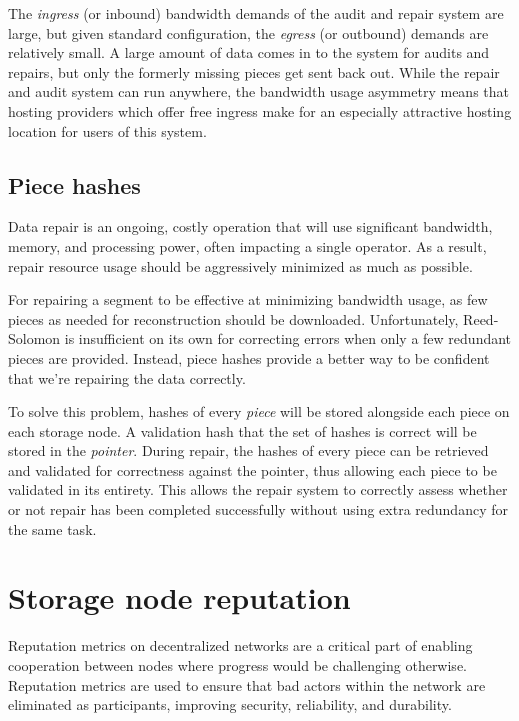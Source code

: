 \documentclass[8pt,fleqn,openany]{book}
\begin{document}
The {\em ingress} (or inbound) bandwidth demands of the audit and repair system are large, but
given standard configuration, the {\em egress} (or outbound) demands are relatively small.
A large amount of data comes in to the system for audits and repairs, but only
the formerly missing pieces get sent back out.
While the repair and audit system can run anywhere, the bandwidth usage
asymmetry means that hosting providers which offer free ingress
make for an especially attractive hosting location for users of this system.

\subsection{Piece hashes}\label{sec:concrete-piece-hashes}

Data repair is an ongoing, costly operation that will use significant
bandwidth, memory, and processing power, often impacting a single operator.
As a result, repair resource usage should be aggressively minimized as much as
possible.

For repairing a segment to be effective at minimizing bandwidth usage, as few
pieces as needed for reconstruction should be downloaded. Unfortunately,
Reed-Solomon is insufficient on its own for correcting errors when only a few redundant
pieces are provided. Instead, piece hashes provide a better way to be
confident that we're repairing the data correctly.

To solve this problem, hashes of
every {\em piece} will be stored alongside each piece on each storage node.
A validation hash that the set of hashes is correct will be stored in the
{\em pointer}. During repair, the hashes of every piece can be retrieved and
validated for correctness against the pointer, thus allowing each piece to
be validated in its entirety. This allows the repair system to correctly assess
whether or not repair has been completed successfully without using extra
redundancy for the same task.

\section{Storage node reputation}\label{sec:concrete-reputation}

Reputation metrics on decentralized networks are a critical part of
enabling cooperation
between nodes
where progress would be challenging otherwise. Reputation metrics
are used to ensure that bad actors
within the network are eliminated as participants, improving security,
reliability, and durability.
\end{document}
